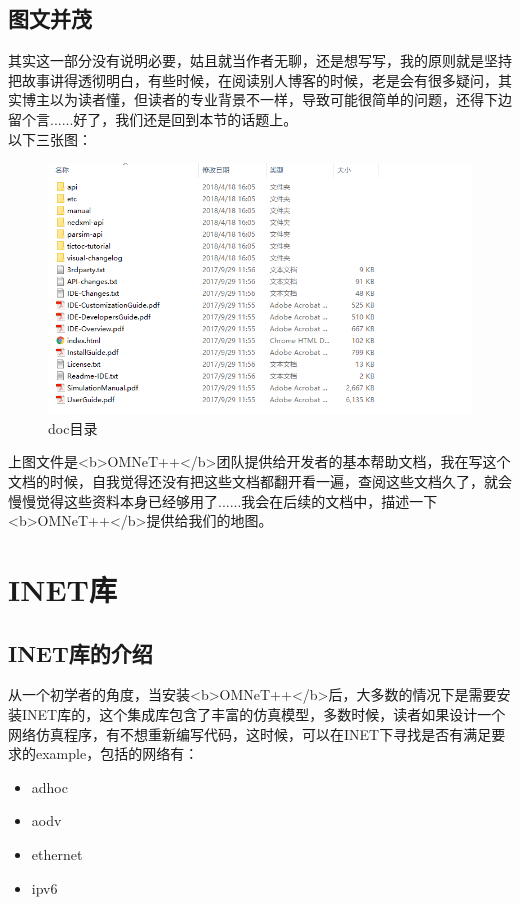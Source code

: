 \subsection{图文并茂}
其实这一部分没有说明必要，姑且就当作者无聊，还是想写写，我的原则就是坚持把故事讲得透彻明白，有些时候，在阅读别人博客的时候，老是会有很多疑问，其实博主以为读者懂，但读者的专业背景不一样，导致可能很简单的问题，还得下边留个言......好了，我们还是回到本节的话题上。\\
以下三张图：
\begin{figure}	
	\centering
	\includegraphics[width=\textwidth]{../img/chapter2/doc}
	\caption{doc目录}\label{fig:1a}		
\end{figure}

上图文件是<b>OMNeT++</b>团队提供给开发者的基本帮助文档，我在写这个文档的时候，自我觉得还没有把这些文档都翻开看一遍，查阅这些文档久了，就会慢慢觉得这些资料本身已经够用了......我会在后续的文档中，描述一下<b>OMNeT++</b>提供给我们的地图。

\section{INET库}

\subsection{INET库的介绍}
从一个初学者的角度，当安装<b>OMNeT++</b>后，大多数的情况下是需要安装INET库的，这个集成库包含了丰富的仿真模型，多数时候，读者如果设计一个网络仿真程序，有不想重新编写代码，这时候，可以在INET下寻找是否有满足要求的example，包括的网络有：

\begin{itemize}
\item adhoc
\item aodv
\item ethernet
\item ipv6
\end{itemize}

